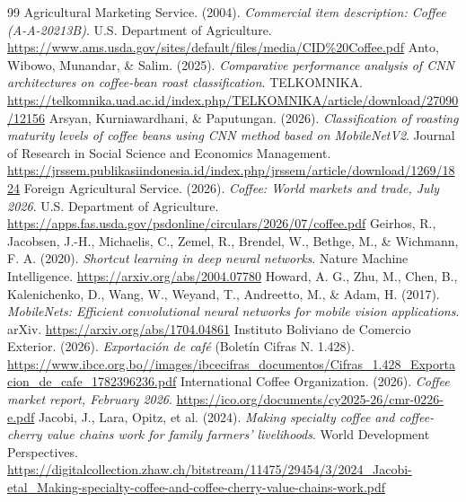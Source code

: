 \begin{thebibliography}{99}
 Agricultural Marketing Service. (2004). \textit{Commercial item description: Coffee (A-A-20213B)}. U.S. Department of Agriculture. \url{https://www.ams.usda.gov/sites/default/files/media/CID\%20Coffee.pdf}
 Anto, Wibowo, Munandar, \& Salim. (2025). \textit{Comparative performance analysis of CNN architectures on coffee-bean roast classification}. TELKOMNIKA. \url{https://telkomnika.uad.ac.id/index.php/TELKOMNIKA/article/download/27090/12156}
 Arsyan, Kurniawardhani, \& Paputungan. (2026). \textit{Classification of roasting maturity levels of coffee beans using CNN method based on MobileNetV2}. Journal of Research in Social Science and Economics Management. \url{https://jrssem.publikasiindonesia.id/index.php/jrssem/article/download/1269/1824}
 Foreign Agricultural Service. (2026). \textit{Coffee: World markets and trade, July 2026}. U.S. Department of Agriculture. \url{https://apps.fas.usda.gov/psdonline/circulars/2026/07/coffee.pdf}
 Geirhos, R., Jacobsen, J.-H., Michaelis, C., Zemel, R., Brendel, W., Bethge, M., \& Wichmann, F. A. (2020). \textit{Shortcut learning in deep neural networks}. Nature Machine Intelligence. \url{https://arxiv.org/abs/2004.07780}
 Howard, A. G., Zhu, M., Chen, B., Kalenichenko, D., Wang, W., Weyand, T., Andreetto, M., \& Adam, H. (2017). \textit{MobileNets: Efficient convolutional neural networks for mobile vision applications}. arXiv. \url{https://arxiv.org/abs/1704.04861}
 Instituto Boliviano de Comercio Exterior. (2026). \textit{Exportaci\'on de caf\'e} (Bolet\'in Cifras N.\textordmasculine{} 1.428). \url{https://www.ibce.org.bo//images/ibcecifras_documentos/Cifras_1.428_Exportacion_de_cafe_1782396236.pdf}
 International Coffee Organization. (2026). \textit{Coffee market report, February 2026}. \url{https://ico.org/documents/cy2025-26/cmr-0226-e.pdf}
 Jacobi, J., Lara, Opitz, et al. (2024). \textit{Making specialty coffee and coffee-cherry value chains work for family farmers' livelihoods}. World Development Perspectives. \url{https://digitalcollection.zhaw.ch/bitstream/11475/29454/3/2024_Jacobi-etal_Making-specialty-coffee-and-coffee-cherry-value-chains-work.pdf}

\end{thebibliography}
